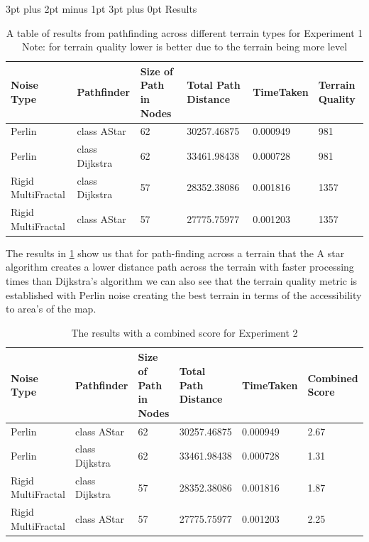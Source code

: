 \documentclass[12pt,a4paper]{article}
\makeatletter
\renewcommand\subsection{\@startsection {subsection}{1}{2mm} %
                               {3pt plus 2pt minus 1pt} %
                               {3pt plus 0pt} %
                               {\normalfont\bfseries}}
\makeatother
\begin{document}
\subsection{Results}
\label{Results}
\begin{table}[h!]
\begin{tabular}{|p{2.7cm}|p{2cm}|p{2.5cm}|p{2.2cm}|p{2.2cm}|p{1.4cm}|}
	\hline
Noise Type&	Pathfinder&	Size of Path in Nodes	& Total Path Distance	& TimeTaken	& Terrain Quality\\
\hline
Perlin&	class AStar&	62	& 30257.46875	& 0.000949	& 981\\
\hline
Perlin&	class Dijkstra&	62&	33461.98438&	0.000728&	981\\
\hline
Rigid  MultiFractal&	class Dijkstra&	57&	28352.38086&	0.001816&	1357\\
\hline
Rigid MultiFractal&	class AStar&	57&	27775.75977&	0.001203&	1357\\
\hline
\end{tabular}
\caption{A table of results from pathfinding across different terrain types for Experiment 1 \\Note: for terrain quality lower is better due to the terrain being more level}
	\label{Experiment1}
\end{table}

The results in \ref{Experiment1} show us that for path-finding across a terrain that the A star algorithm creates a lower distance path across the terrain with faster processing times than Dijkstra's algorithm we can also see that the terrain quality metric is established with Perlin noise creating the best terrain in terms of the accessibility to area's of the map.  

\begin{table}[h!]
	\begin{tabular}{|p{2.7cm}|p{2cm}|p{2.5cm}|p{2.2cm}|p{2.2cm}|p{1.6cm}|}
		\hline
		Noise Type&	Pathfinder&	Size of Path in Nodes	& Total Path Distance	& TimeTaken	&  Combined Score\\
		\hline
		Perlin&	class AStar&	62	& 30257.46875	& 0.000949	& 2.67\\
		\hline
		Perlin&	class Dijkstra&	62&	33461.98438&	0.000728&	1.31\\
		\hline
		Rigid  MultiFractal&	class Dijkstra&	57&	28352.38086&	0.001816&	1.87\\
		\hline
		Rigid MultiFractal&	class AStar&	57&	27775.75977&	0.001203&	2.25\\
		\hline
	\end{tabular}
	\caption{The results with a combined score for Experiment 2}
	\label{Experiment 2}
\end{table}
\end{document}
